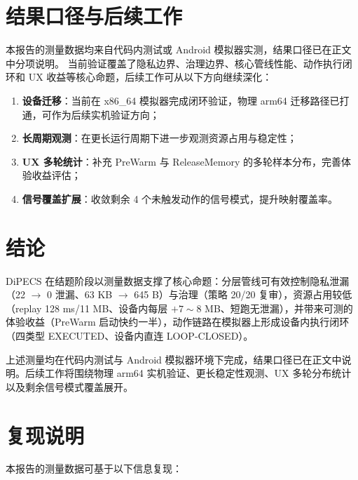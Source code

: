 \documentclass[12pt,a4paper]{article}
\begin{document}
\section{结果口径与后续工作}\label{sec:limitations}

本报告的测量数据均来自代码内测试或 Android 模拟器实测，结果口径已在正文中分项说明。
当前验证覆盖了隐私边界、治理边界、核心管线性能、动作执行闭环和 UX 收益等核心命题，后续工作可从以下方向继续深化：

\begin{enumerate}[label=(\arabic*)]
  \item \textbf{设备迁移}：当前在 x86\_64 模拟器完成闭环验证，物理 arm64 迁移路径已打通，可作为后续实机验证方向；
  \item \textbf{长周期观测}：在更长运行周期下进一步观测资源占用与稳定性；
  \item \textbf{UX 多轮统计}：补充 PreWarm 与 ReleaseMemory 的多轮样本分布，完善体验收益评估；
  \item \textbf{信号覆盖扩展}：收敛剩余 4 个未触发动作的信号模式，提升映射覆盖率。
\end{enumerate}

\section{结论}\label{sec:conclusion}

DiPECS 在结题阶段以测量数据支撑了核心命题：分层管线可有效控制隐私泄漏（22 $\rightarrow$ 0 泄漏、63 KB $\rightarrow$ 645 B）与治理（策略 20/20 复审），资源占用较低（replay 128 ms/11 MB、设备内每层 $+7\sim8$ MB、短跑无泄漏），并带来可测的体验收益（PreWarm 启动快约一半），动作链路在模拟器上形成设备内执行闭环（四类型 EXECUTED、设备内直连 LOOP-CLOSED）。

上述测量均在代码内测试与 Android 模拟器环境下完成，结果口径已在正文中说明。后续工作将围绕物理 arm64 实机验证、更长稳定性观测、UX 多轮分布统计以及剩余信号模式覆盖展开。

\appendix
\section{复现说明}\label{app:reproduction}

本报告的测量数据可基于以下信息复现：
\end{document}

